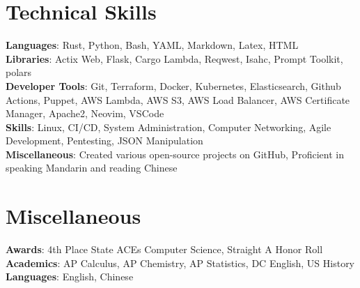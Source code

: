 \documentclass[letterpaper,11pt]{article}
\begin{document}
\section{Technical Skills}
 \begin{itemize}[leftmargin=0.15in, label={}]
    \small{\item{
     \textbf{Languages}{: Rust, Python, Bash, YAML, Markdown, Latex, HTML} \\
     \textbf{Libraries}{: Actix Web, Flask, Cargo Lambda, Reqwest, Isahc, Prompt Toolkit, polars} \\
     \textbf{Developer Tools}{: Git, Terraform, Docker, Kubernetes, Elasticsearch, Github Actions, Puppet, AWS Lambda, AWS S3, AWS Load Balancer, AWS Certificate Manager, Apache2, Neovim, VSCode} \\
     \textbf{Skills}{: Linux, CI/CD, System Administration, Computer Networking, Agile Development, Pentesting, JSON Manipulation} \\
     \textbf{Miscellaneous}{: Created various open-source projects on GitHub, Proficient in speaking Mandarin and reading Chinese} \\
    }}
 \end{itemize}


\section{Miscellaneous}
 \begin{itemize}[leftmargin=0.15in, label={}]
    \small{\item{
     \textbf{Awards}{: 4th Place State ACEs Computer Science, Straight A Honor Roll} \\
     \textbf{Academics}{: AP Calculus, AP Chemistry, AP Statistics, DC English, US History} \\
     \textbf{Languages}{: English, Chinese} \\
    }}
 \end{itemize}


\end{document}
